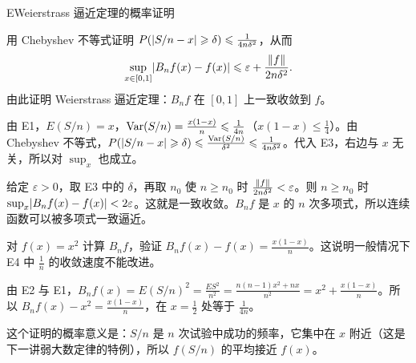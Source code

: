 \begin{probleme}{E}{Weierstrass 逼近定理的概率证明}
\begin{questions}
\item 用 Chebyshev 不等式证明 $P(\lvert S/n-x\rvert\geqslant\delta)\leqslant\frac1{4n\delta^2}$，从而
\[
\sup_{x\in[0,1]}\lvert B_nf(x)-f(x)\rvert\leqslant\varepsilon+\frac{\lVert f\rVert}{2n\delta^2}.
\]
由此证明 Weierstrass 逼近定理：$B_nf$ 在 $[0,1]$ 上一致收敛到 $f$。
\begin{solution}
由 E1，$E(S/n)=x$，$\operatorname{Var}(S/n)=\frac{x(1-x)}n\leqslant\frac1{4n}$（$x(1-x)\leqslant\frac14$）。由 Chebyshev 不等式，$P(\lvert S/n-x\rvert\geqslant\delta)\leqslant\frac{\operatorname{Var}(S/n)}{\delta^2}\leqslant\frac1{4n\delta^2}$。代入 E3，右边与 $x$ 无关，所以对 $\sup_x$ 也成立。

给定 $\varepsilon>0$，取 E3 中的 $\delta$，再取 $n_0$ 使 $n\geqslant n_0$ 时 $\frac{\lVert f\rVert}{2n\delta^2}<\varepsilon$。则 $n\geqslant n_0$ 时 $\sup_x\lvert B_nf(x)-f(x)\rvert<2\varepsilon$。这就是一致收敛。$B_nf$ 是 $x$ 的 $n$ 次多项式，所以连续函数可以被多项式一致逼近。
\end{solution}

\item 对 $f(x)=x^2$ 计算 $B_nf$，验证 $B_nf(x)-f(x)=\frac{x(1-x)}n$。这说明一般情况下 E4 中 $\frac1n$ 的收敛速度不能改进。
\begin{solution}
由 E2 与 E1，$B_nf(x)=E(S/n)^2=\frac{ES^2}{n^2}=\frac{n(n-1)x^2+nx}{n^2}=x^2+\frac{x(1-x)}n$。所以 $B_nf(x)-x^2=\frac{x(1-x)}n$，在 $x=\frac12$ 处等于 $\frac1{4n}$。

这个证明的概率意义是：$S/n$ 是 $n$ 次试验中成功的频率，它集中在 $x$ 附近（这是下一讲弱大数定律的特例），所以 $f(S/n)$ 的平均接近 $f(x)$。
\end{solution}
\end{questions}
\end{probleme}
